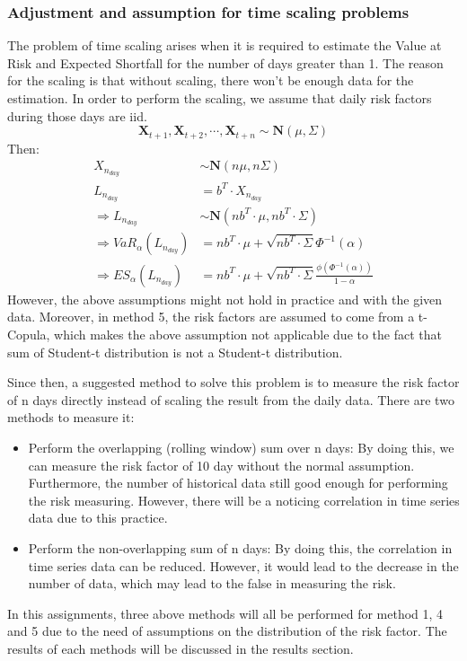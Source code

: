 \subsubsection{Adjustment and assumption for time scaling problems}
The problem of time scaling arises when it is required to estimate the Value at Risk and Expected Shortfall for the number of days greater than 1. The reason for the scaling is that without scaling, there won't be enough data for the estimation. In order to perform the scaling, we assume that daily risk factors during those days are iid. 
\[
\mathbf{X}_{t+1},\mathbf{X}_{t+2}, \cdots ,\mathbf{X}_{t+n}\sim\mathbf{N}(\mu,\Sigma)
\]
Then:
\begin{align*}
    X_{n_{day}}&\sim\mathbf{N}(n\mu, n\Sigma)\\
    L_{n_{day}}&=b^T\cdot X_{n_{day}}\\
    \Longrightarrow L_{n_{day}}&\sim\mathbf{N}(n b^T\cdot\mu, n b^T\cdot\Sigma)\\
    \Longrightarrow VaR_\alpha(L_{n_{day}})&=n b^T\cdot\mu+\sqrt{n b^T\cdot\Sigma}\Phi^{-1}(\alpha)\\
    \Longrightarrow ES_\alpha(L_{n_{day}})&=n b^T\cdot\mu+\sqrt{n b^T\cdot\Sigma}\frac{\phi(\Phi^{-1}(\alpha))}{1-\alpha}
\end{align*}
However, the above assumptions might not hold in practice and with the given data. Moreover, in method 5, the risk factors are assumed to come from a t-Copula, which makes the above assumption not applicable due to the fact that sum of Student-t distribution is not a Student-t distribution.

Since then, a suggested method to solve this problem is to measure the risk factor of n days directly instead of scaling the result from the daily data. There are two methods to measure it:
\begin{itemize}
    \item Perform the overlapping (rolling window) sum over n days: By doing this, we can measure the risk factor of 10 day without the normal assumption. Furthermore, the number of historical data still good enough for performing the risk measuring. However, there will be a noticing correlation in time series data due to this practice.
    \item Perform the non-overlapping sum of n days: By doing this, the correlation in time series data can be reduced. However, it would lead to the decrease in the number of data, which may lead to the false in measuring the risk.
\end{itemize}
In this assignments, three above methods will all be performed for method 1, 4 and 5 due to the need of assumptions on the distribution of the risk factor. The results of each methods will be discussed in the results section.
